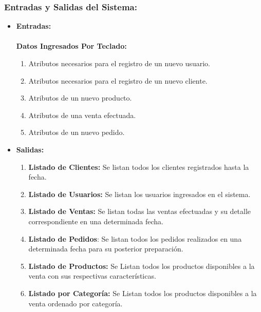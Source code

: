 \documentclass[a4paper,12pt]{article}
\begin{document}
\subsubsection{Entradas y Salidas del Sistema:}
\begin{itemize}
 \item \textbf{Entradas:} \\ \\
     \textbf{Datos Ingresados Por Teclado:}
     \begin{enumerate}
      \item Atributos necesarios para el registro de un nuevo usuario.
      \item Atributos necesarios para el registro de un nuevo cliente.
      \item Atributos de un nuevo producto.
      \item Atributos de una venta efectuada.
      \item Atributos de un nuevo pedido.
     \end{enumerate}


 \item \textbf{Salidas:}
     \begin{enumerate}
       \item \textbf{Listado de Clientes:} Se listan todos los clientes registrados hasta la fecha.

       \item \textbf{Listado de Usuarios:} Se listan los usuarios ingresados en el sistema.

       \item \textbf{Listado de Ventas:} Se listan todas las ventas efectuadas y su detalle correspondiente en una determinada fecha.

       \item \textbf{Listado de Pedidos}: Se listan todos los pedidos realizados en una determinada fecha para su posterior preparación.

       \item \textbf{Listado de Productos:} Se Listan todos los productos disponibles a la venta con sus respectivas características.
       
       \item \textbf{Listado por Categoría: } Se Listan todos los productos disponibles a la venta ordenado por categoría.

     \end{enumerate}
 
       
\end{itemize}
\end{document}
